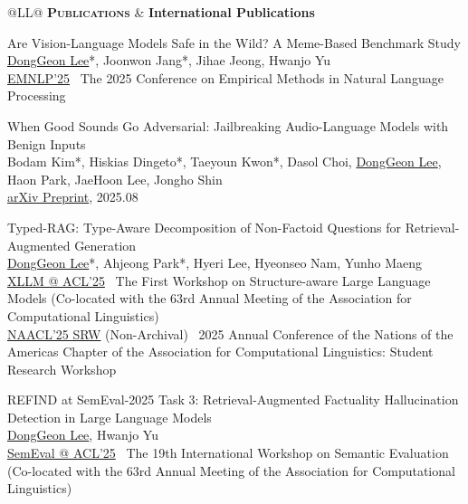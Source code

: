 \documentclass[11pt,a4paper]{article}
\newlength{\leftcolumn}
\newlength{\rightcolumn}
\newlength{\midrightcolumn}
\newcounter{pubnum}
\newenvironment{publications}
{\begin{list}{}
    {\setlength{\leftmargin}{1.35in}
     \setlength{\itemsep}{0.5em}
     \setlength{\labelsep}{0em}
     \renewcommand{\makelabel}[1]{##1}}}
{\end{list}}
\newcommand{\pubitem}[1]{%
    \addtocounter{pubnum}{-1}%
    \item[\textup{[\arabic{pubnum}]}] #1%
}
\begin{document}
\vspace{1em}

\begin{tabular}{@{}L{\leftcolumn}L{\midrightcolumn}@{}}
\textcolor{sectioncolor}{\textsc{\textbf{Publications}}} & \textbf{International Publications}
\end{tabular}
\vspace{-0.5em}

\begin{publications}

\pubitem{
    Are Vision-Language Models Safe in the Wild? A Meme-Based Benchmark Study\\
        \underline{DongGeon Lee}*, Joonwon Jang*, Jihae Jeong,  Hwanjo Yu \\[3pt]
        \href{https://arxiv.org/abs/2505.15389}{EMNLP'25} \textbar\ The 2025 Conference on Empirical Methods in Natural Language Processing
}

\pubitem{
    When Good Sounds Go Adversarial: Jailbreaking Audio-Language Models with Benign Inputs \\
        Bodam Kim*, Hiskias Dingeto*, Taeyoun Kwon*, Dasol Choi, \underline{DongGeon Lee}, Haon Park, JaeHoon Lee, Jongho Shin \\[3pt]
        \href{https://arxiv.org/abs/2508.03365}{arXiv Preprint}, 2025.08
}

\pubitem{
    Typed-RAG: Type-Aware Decomposition of Non-Factoid Questions for Retrieval-Augmented Generation \\
        \underline{DongGeon Lee}*, Ahjeong Park*, Hyeri Lee, Hyeonseo Nam, Yunho Maeng \\[3pt]
        \href{https://aclanthology.org/2025.xllm-1.14/}{XLLM @ ACL'25} \textbar\ The First Workshop on Structure-aware Large Language Models (Co-located with the 63rd Annual Meeting of the Association for Computational Linguistics) \\[1.5pt]
        \href{https://naacl2025-srw.github.io/accepted}{NAACL'25 SRW} (Non-Archival) \textbar\ 2025 Annual Conference of the Nations of the Americas Chapter of the Association for Computational Linguistics: Student Research Workshop
        
}


\pubitem{
    REFIND at SemEval-2025 Task 3: Retrieval-Augmented Factuality Hallucination Detection in Large Language Models\\
        \underline{DongGeon Lee}, Hwanjo Yu \\[3pt]
        \href{https://arxiv.org/abs/2502.13622}{SemEval @ ACL'25} \textbar\ The 19th International Workshop on Semantic Evaluation (Co-located with the 63rd Annual Meeting of the Association for Computational Linguistics)
}


\end{publications}
\end{document}
